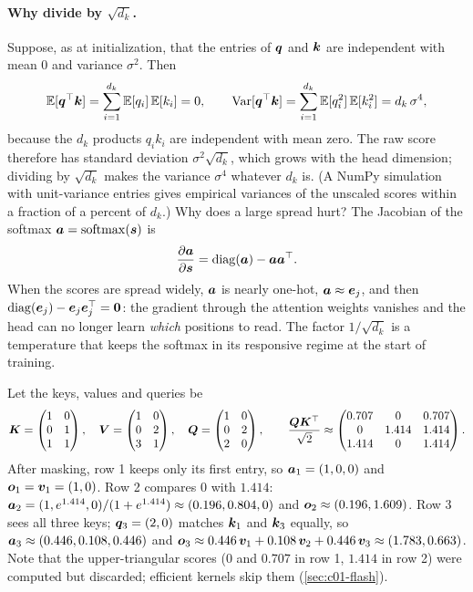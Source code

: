 \paragraph{Why divide by $\sqrt{d_k}$.} Suppose, as at initialization, that the entries of
$\bm{q}$ and $\bm{k}$ are independent with mean $0$ and variance $\sigma^2$. Then
\[
  \mathbb{E}[\bm{q}^{\top}\bm{k}] = \sum_{i=1}^{d_k}\mathbb{E}[q_i]\,\mathbb{E}[k_i] = 0,\qquad
  \mathrm{Var}[\bm{q}^{\top}\bm{k}] = \sum_{i=1}^{d_k}\mathbb{E}[q_i^2]\,\mathbb{E}[k_i^2] = d_k\,\sigma^4,
\]
because the $d_k$ products $q_i k_i$ are independent with mean zero. The raw score therefore
has standard deviation $\sigma^2\sqrt{d_k}$, which grows with the head dimension; dividing
by $\sqrt{d_k}$ makes the variance $\sigma^4$ whatever $d_k$ is. (A NumPy simulation with
unit-variance entries gives empirical variances of the unscaled scores within a fraction of
a percent of $d_k$.) Why does a large spread hurt? The Jacobian of the softmax
$\bm{a} = \operatorname{softmax}(\bm{s})$ is
\begin{equation}\label{eq:c01-softmax-jacobian}
  \frac{\partial \bm{a}}{\partial \bm{s}} = \operatorname{diag}(\bm{a}) - \bm{a}\bm{a}^{\top} .
\end{equation}
When the scores are spread widely, $\bm{a}$ is nearly one-hot, $\bm{a} \approx \bm{e}_j$, and then
$\operatorname{diag}(\bm{e}_j) - \bm{e}_j\bm{e}_j^{\top} = \bm{0}$: the gradient through the attention weights
vanishes and the head can no longer learn \emph{which} positions to read. The factor
$1/\sqrt{d_k}$ is a temperature that keeps the softmax in its responsive regime at the start
of training.

\begin{example}[Attention with $d_k = 2$, $T = 3$]\label{ex:c01-attention}
Let the keys, values and queries be
\[
\bm{K} = \begin{pmatrix} 1 & 0\\ 0 & 1\\ 1 & 1\end{pmatrix},\quad
\bm{V} = \begin{pmatrix} 1 & 0\\ 0 & 2\\ 3 & 1\end{pmatrix},\quad
\bm{Q} = \begin{pmatrix} 1 & 0\\ 0 & 2\\ 2 & 0\end{pmatrix},\qquad
\frac{\bm{Q}\bm{K}^{\top}}{\sqrt{2}} \approx
\begin{pmatrix} 0.707 & 0 & 0.707\\ 0 & 1.414 & 1.414\\ 1.414 & 0 & 1.414\end{pmatrix}.
\]
After masking, row 1 keeps only its first entry, so $\bm{a}_1 = (1, 0, 0)$ and $\bm{o}_1 = \bm{v}_1 =
(1, 0)$. Row 2 compares $0$ with $1.414$: $\bm{a}_2 = (1, e^{1.414}, 0)/(1 + e^{1.414}) \approx
(0.196, 0.804, 0)$ and $\bm{o}_2 \approx (0.196, 1.609)$. Row 3 sees all three keys; $\bm{q}_3 =
(2, 0)$ matches $\bm{k}_1$ and $\bm{k}_3$ equally, so $\bm{a}_3 \approx (0.446, 0.108, 0.446)$ and
$\bm{o}_3 \approx 0.446\,\bm{v}_1 + 0.108\,\bm{v}_2 + 0.446\,\bm{v}_3 \approx (1.783, 0.663)$. Note that
the upper-triangular scores ($0$ and $0.707$ in row 1, $1.414$ in row 2) were computed but
discarded; efficient kernels skip them (\cref{sec:c01-flash}).
\end{example}

